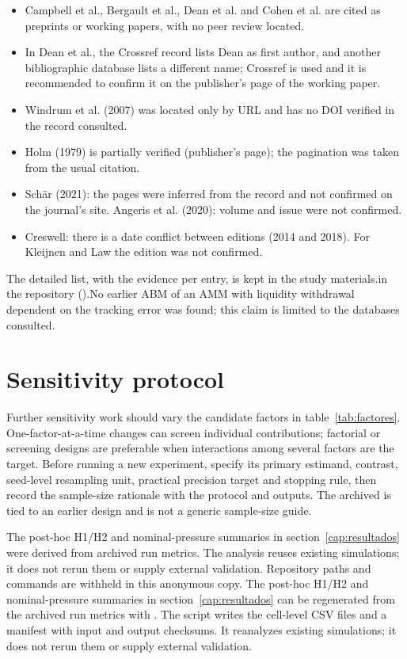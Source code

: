 \begin{itemize}
  \item Campbell et al., Bergault et al., Dean et al. and Cohen et al. are cited as preprints or working papers, with no peer review located.
  \item In Dean et al., the Crossref record lists Dean as first author, and another bibliographic database lists a different name; Crossref is used and it is recommended to confirm it on the publisher's page of the working paper.
  \item Windrum et al. (2007) was located only by URL and has no DOI verified in the record consulted.
  \item Holm (1979) is partially verified (publisher's page); the pagination was taken from the usual citation.
  \item Schär (2021): the pages were inferred from the record and not confirmed on the journal's site. Angeris et al. (2020): volume and issue were not confirmed.
  \item Creswell: there is a date conflict between editions (2014 and 2018). For Kleijnen and Law the edition was not confirmed.
\end{itemize}

The detailed list, with the evidence per entry, is kept \ifdefined\blindreviewmode in the study materials.\else in the repository ().\fi No earlier ABM of an AMM with liquidity withdrawal dependent on the tracking error was found; this claim is limited to the databases consulted.

\section{Sensitivity protocol}
\label{sec:sensibilidad}

Further sensitivity work should vary the candidate factors in table~\ref{tab:factores}. One-factor-at-a-time changes can screen individual contributions; factorial or screening designs \cite{morris1991factorial,saltelli2010variance} are preferable when interactions among several factors are the target. Before running a new experiment, specify its primary estimand, contrast, seed-level resampling unit, practical precision target and stopping rule, then record the sample-size rationale with the protocol and outputs. The archived  is tied to an earlier design and is not a generic sample-size guide.

\ifdefined\blindreviewmode
The post-hoc H1/H2 and nominal-pressure summaries in section~\ref{cap:resultados} were derived from archived run metrics. The analysis reuses existing simulations; it does not rerun them or supply external validation. Repository paths and commands are withheld in this anonymous copy.
\else
The post-hoc H1/H2 and nominal-pressure summaries in section~\ref{cap:resultados} can be regenerated from the archived run metrics with . The script writes the cell-level CSV files and a manifest with input and output checksums. It reanalyzes existing simulations; it does not rerun them or supply external validation.
\fi
